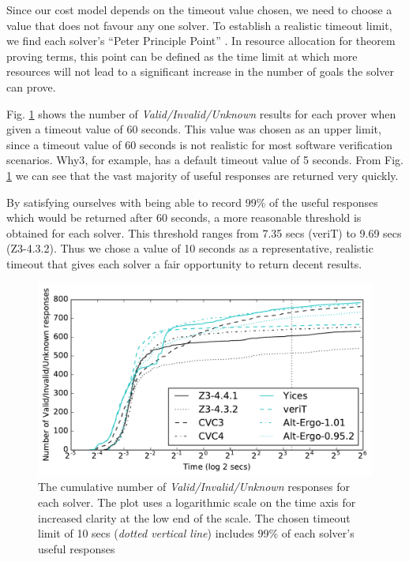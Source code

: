 \documentclass[runningheads,a4paper]{llncs}
\begin{document}
Since our cost model depends on the timeout value chosen, we need to choose a value that does not favour any one solver.  To establish a realistic timeout limit, we find each solver's ``Peter Principle Point'' \cite{Sutcliffe200139}. In resource allocation for theorem proving terms, this point can be defined as the time limit at which more resources will not lead to a significant increase in the number of goals the solver can prove. 

Fig. \ref{fig:line_graph} shows the number of \textit{Valid/Invalid/Unknown} results for each prover when given a timeout value of 60 seconds. 
This value was chosen as an upper limit, since a timeout value of 60 seconds is not realistic for most software verification scenarios.  \textsf{Why3}, for example, has a default timeout value of 5 seconds. 
From Fig. \ref{fig:line_graph} we can see that the vast majority of useful responses are returned very quickly. 

By satisfying ourselves with being able to record 99\% of the useful responses which would be returned after 60 seconds, a more reasonable threshold is obtained for each solver. This threshold ranges from 7.35 secs (veriT) to 9.69 secs (Z3-4.3.2). Thus we chose a value of 10 seconds as a representative, realistic timeout that gives each solver a fair opportunity to return decent results.     

\begin{figure}
\centering
\includegraphics[width=\linewidth]{line_graph}
\caption{The cumulative number of \textit{Valid/Invalid/Unknown} responses for each solver. The plot uses a logarithmic scale on the time axis for increased clarity at the low end of the scale. The chosen timeout limit of 10 secs (\textit{dotted vertical line}) includes 99\% of each solver's useful responses}
\label{fig:line_graph}
\end{figure}
\end{document}
